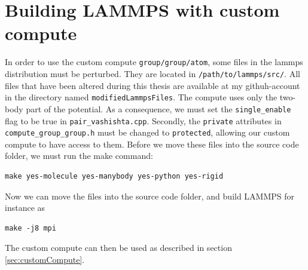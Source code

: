 \documentclass[twoside,english]{uiofysmaster}
\begin{document}
\section{Building LAMMPS with custom compute}
In order to use the custom compute \texttt{group/group/atom}, some files in the lammps distribution must be perturbed.
They are located in \texttt{/path/to/lammps/src/}.  
All files that have been altered during this thesis are available at my githuh-account in the directory named \texttt{modifiedLammpsFiles}.  
The compute uses only the two-body part of the potential. 
As a consequence, we must set the \texttt{single\_enable} flag to be true in \texttt{pair\_vashishta.cpp}. 
Secondly, the \texttt{private} attributes in \texttt{compute\_group\_group.h} must be changed to \texttt{protected}, allowing our custom compute to have access to them.
Before we move these files into  the source code folder, we must run the make command:
\begin{lstlisting}
make yes-molecule yes-manybody yes-python yes-rigid 
\end{lstlisting}
Now we can move the files into the source code folder, and build LAMMPS for instance as
\begin{lstlisting}
make -j8 mpi
\end{lstlisting}
The custom compute can then be used as described in section \ref{sec:customCompute}.






\end{document}
